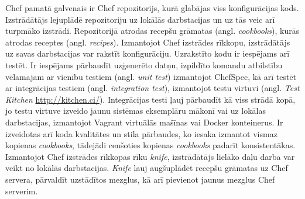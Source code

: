 Chef pamatā galvenais ir Chef repozitorijs, kurā glabājas viss konfigurācijas kods. Izstrādātājs lejuplādē repozitoriju uz lokālās darbstacijas un uz tās veic arī turpmāko izstrādi. Repozitorijā atrodas recepšu grāmatas (angl. \textit{cookbooks}), kurās atrodas receptes (angl. \textit{recipes}).
Izmantojot Chef izstrādes rīkkopu, izstrādātājs uz savas darbstacijas var rakstīt konfigurāciju.
Uzrakstīto kodu ir iespējams arī testēt. Ir iespējams pārbaudīt uzģenerēto datņu, izpildīto komandu atbilstību vēlamajam ar vienību testiem (angl. \textit{unit test}) izmantojot ChefSpec, kā arī testēt ar integrācijas testiem (angl. \textit{integration test}), izmantojot testu virtuvi (angl. \textit{Test Kitchen} \url{http://kitchen.ci/}). Integrācijas testi ļauj pārbaudīt kā viss strādā kopā, jo testu virtuve izveido jaunu sistēmas eksemplāru mākonī vai uz lokālas darbstacijas, izmantojot Vagrant virtuālās mašīnas vai Docker konteinerus. Ir izveidotas arī koda kvalitātes un stila pārbaudes, ko iesaka izmantot vismaz kopienas \textit{cookbooks}, tādejādi cenšoties kopienas \textit{cookbooks} padarīt konsistentākas.
Izmantojot Chef izstrādes rīkkopas rīku \textit{knife}, izstrādātājs lielāko daļu darba var veikt no lokālās darbstacijas. \textit{Knife} ļauj augšuplādēt recepšu grāmatas uz Chef servera, pārvaldīt uzstādītos mezglus, kā arī pievienot jaunus mezglus Chef serverim.

%

